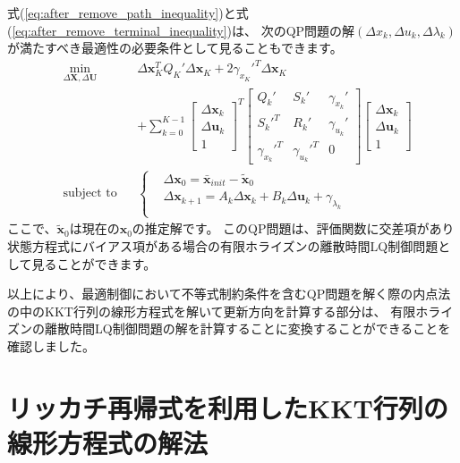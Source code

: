 \documentclass[a4paper]{jarticle}
\begin{document}
式(\ref{eq:after_remove_path_inequality})と式(\ref{eq:after_remove_terminal_inequality})は、
次のQP問題の解$(\Delta x_k,\Delta u_k,\Delta \lambda_k)$が満たすべき最適性の必要条件として見ることもできます。
\begin{equation*}
\begin{aligned}
& \underset{ \Delta\mathbf{X}, \Delta\mathbf{U}}{\text{min}} && 
\Delta \mathbf{x}_K^TQ_K'\Delta \mathbf{x}_K + 2 \gamma_{x_K}'^T\Delta \mathbf{x}_K
\\
&  && 
+
\sum_{k=0}^{K-1}
\begin{bmatrix} \Delta \mathbf{x}_k \\ \Delta \mathbf{u}_k \\ 1\end{bmatrix}^T
\begin{bmatrix} Q_k' & S_k' & \gamma_{x_k}' \\ S_k'^T & R_k' & \gamma_{u_k}' \\ \gamma_{x_k}'^T & \gamma_{u_k}'^T & 0\end{bmatrix}
\begin{bmatrix} \Delta \mathbf{x}_k \\ \Delta \mathbf{u}_k \\ 1\end{bmatrix} \\
&\text{subject to} && \left \{
\begin{aligned}
    & \Delta\mathbf{x}_0 = \bar{\mathbf{x}}_{init} - \tilde{\mathbf{x}}_{0}\\
    & \Delta \mathbf{x}_{k+1} = A_k \Delta \mathbf{x}_k + B_k \Delta \mathbf{u}_k + \gamma_{\lambda_k}\\
\end{aligned}
\right .
\end{aligned}
\end{equation*}
ここで、$\tilde{\mathbf{x}}_{0}$は現在の$\mathbf{x}_0$の推定解です。
このQP問題は、評価関数に交差項があり状態方程式にバイアス項がある場合の有限ホライズンの離散時間LQ制御問題として見ることができます。

以上により、最適制御において不等式制約条件を含むQP問題を解く際の内点法の中のKKT行列の線形方程式を解いて更新方向を計算する部分は、
有限ホライズンの離散時間LQ制御問題の解を計算することに変換することができることを確認しました。


\clearpage
\section{リッカチ再帰式を利用したKKT行列の線形方程式の解法}
\label{sec:riccati_recursion}
\end{document}
